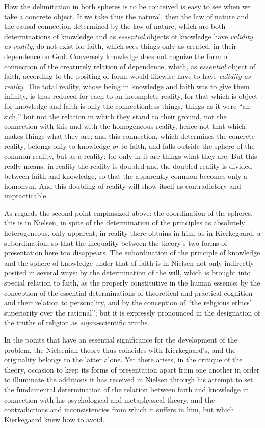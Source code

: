 \documentclass[12pt,a4paper]{book}
\begin{document}
How the delimitation in both spheres is to be conceived is easy to see when we
take a concrete object. If we take thus the natural, then the law of nature and
the causal connection determined by the law of nature, which are both
determinations of knowledge and as \emph{essential} objects of knowledge have \emph{validity
as reality}, do not exist for faith, which sees things only as created, in their
dependence on God. Conversely knowledge does not cognize the form of connection
of the creaturely relation of dependence, which, as \emph{essential} object of faith,
according to the positing of form, would likewise have to have \emph{validity as
reality}. The total reality, whose being in knowledge and faith was to give them
infinity, is thus reduced for each to an incomplete reality, for that which is
object for knowledge and faith is only the connectionless things, things as it
were ``an sich,'' but not the relation in which they stand to their ground, not
the connection with this and with the homogeneous reality, hence not that which
makes things what they are; and this connection, which determines the concrete
reality, belongs only to knowledge \emph{or} to faith, and falls outside the sphere of
the common reality, but as a reality; for only in it are things what they are.
But this really means: in reality the reality is doubled and the doubled reality
is divided between faith and knowledge, so that the apparently common becomes
only a homonym. And this doubling of reality will show itself as contradictory
and impracticable.

As regards the second point emphasized above: the coordination of the spheres,
this is in Nielsen, in spite of the determination of the principles as
absolutely heterogeneous, only apparent; in reality there obtains in him, as in
Kierkegaard, a subordination, so that the inequality between the theory's two
forms of presentation here too disappears. The subordination of the principle of
knowledge and the sphere of knowledge under that of faith is in Nielsen not only
indirectly posited in several ways: by the determination of the will, which is
brought into special relation to faith, as the properly constitutive in the
human essence; by the conception of the essential determinations of theoretical
and practical cognition and their relation to personality, and by the conception
of ``the religious ethics' superiority over the rational''; but it is expressly
pronounced in the designation of the truths of religion as \emph{supra}-scientific
truths.

In the points that have an essential significance for the development of the
problem, the Nielsenian theory thus coincides with Kierkegaard's, and the
originality belongs to the latter alone. Yet there arises, in the critique of
the theory, occasion to keep its forms of presentation apart from one another in
order to illuminate the additions it has received in Nielsen through his attempt
to set the fundamental determination of the relation between faith and knowledge
in connection with his psychological and metaphysical theory, and the
contradictions and inconsistencies from which it suffers in him, but which
Kierkegaard knew how to avoid.
\end{document}
